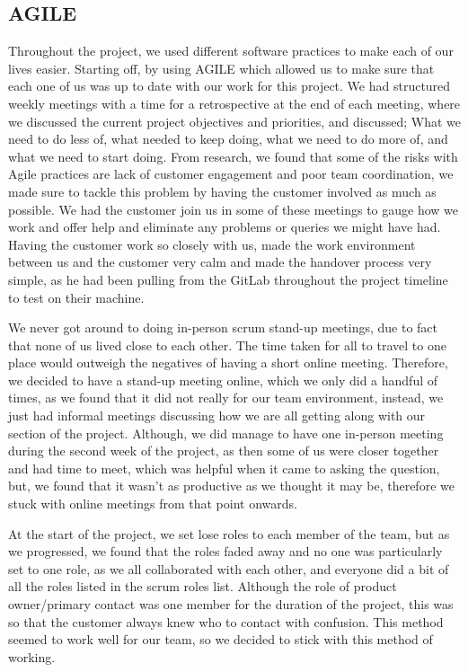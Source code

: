 \documentclass{l3proj}
\begin{document}
\subsection{AGILE}
Throughout the project, we used different software practices to make each of our lives easier. Starting off, by using AGILE which allowed us to make sure that each one of us was up to date with our work for this project. We had structured weekly meetings with a time for a retrospective at the end of each meeting, where we discussed the current project objectives and priorities, and discussed; What we need to do less of, what needed to keep doing, what we need to do more of, and what we need to start doing. From research, we found that some of the risks with Agile practices are lack of customer engagement and poor team coordination, we made sure to tackle this problem by having the customer involved as much as possible. We had the customer join us in some of these meetings to gauge how we work and offer help and eliminate any problems or queries we might have had. Having the customer work so closely with us, made the work environment between us and the customer very calm and made the handover process very simple, as he had been pulling from the GitLab throughout the project timeline to test on their machine. 

We never got around to doing in-person scrum stand-up meetings, due to fact that none of us lived close to each other. The time taken for all to travel to one place would outweigh the negatives of having a short online meeting. Therefore, we decided to have a stand-up meeting online, which we only did a handful of times, as we found that it did not really for our team environment, instead, we just had informal meetings discussing how we are all getting along with our section of the project. Although, we did manage to have one in-person meeting during the second week of the project, as then some of us were closer together and had time to meet, which was helpful when it came to asking the question, but, we found that it wasn’t as productive as we thought it may be, therefore we stuck with online meetings from that point onwards.

At the start of the project, we set lose roles to each member of the team, but as we progressed, we found that the roles faded away and no one was particularly set to one role, as we all collaborated with each other, and everyone did a bit of all the roles listed in the scrum roles list. Although the role of product owner/primary contact was one member for the duration of the project, this was so that the customer always knew who to contact with confusion. This method seemed to work well for our team, so we decided to stick with this method of working.
\end{document}
